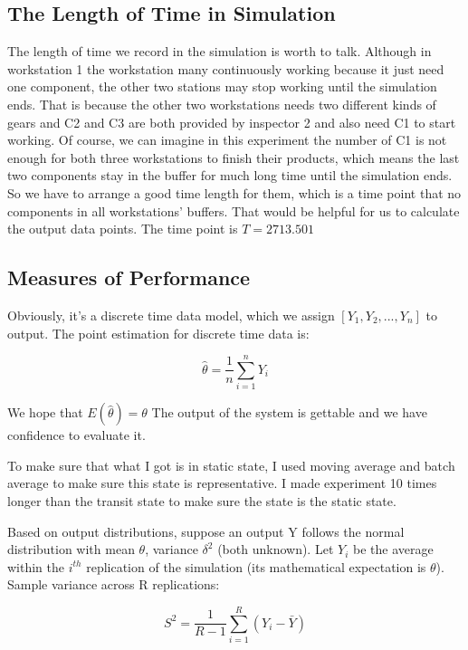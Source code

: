 \documentclass{article}
\begin{document}
\subsection{The Length of Time in Simulation}
The length of time we record in the simulation is worth to talk. Although in workstation 1 the workstation many continuously working because it just need one component, the other two stations may stop working until the simulation ends. That is because the other two workstations needs two different kinds of gears and C2 and C3 are both provided by inspector 2 and also need C1 to start working. Of course, we can imagine in this experiment the number of C1 is not enough for both three workstations to finish their products, which means the last two components stay in the buffer for much long time until the simulation ends. So we have to arrange a good time length for them, which is a time point that no components in all workstations' buffers. That would be helpful for us to calculate the output data points. The time point is $T = 2713.501$
\subsection{Measures of Performance}
Obviously, it's a discrete time data model, which we assign $[Y_1, Y_2, ..., Y_n]$ to output. The point estimation for discrete time data is:

\begin{equation}
\hat \theta = \frac{1}{n} \sum_{i=1}^{n}Y_i
\end{equation}

We hope that $E(\hat \theta)=\theta$
The output of the system is gettable and we have confidence to evaluate it.

To make sure that what I got is in static state, I used moving average and batch average to make sure this state is representative. I made experiment 10 times longer than the transit state to make sure the state is the static state. 

Based on output distributions, suppose an output Y follows the normal distribution with mean $\theta$,
variance $\delta ^2$ (both unknown). Let $Y_i$ be the average within the $i^{th}$ replication of the simulation (its
mathematical expectation is $\theta$). Sample variance across R replications:

\begin{equation}
S^2 = {\frac{1}{R-1} \sum^{R}_{i=1} (Y_i-\bar Y)}
\end{equation}
\end{document}
